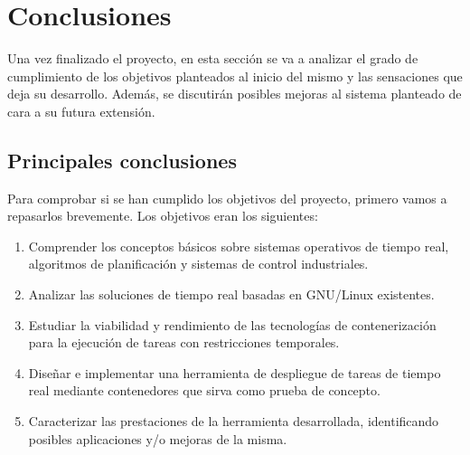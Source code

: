 \chapter{Conclusiones}
Una vez finalizado el proyecto, en esta sección se va a analizar el grado de
cumplimiento de los objetivos planteados al inicio del mismo y las sensaciones
que deja su desarrollo. Además, se discutirán posibles mejoras al sistema
planteado de cara a su futura extensión.

\section{Principales conclusiones}

Para comprobar si se han cumplido los objetivos del proyecto, primero vamos a
repasarlos brevemente. Los objetivos eran los siguientes:

\begin{enumerate}
    \item Comprender los conceptos básicos sobre sistemas operativos de tiempo
          real, algoritmos de planificación y sistemas de control industriales.
    \item Analizar las soluciones de tiempo real basadas en GNU/Linux existentes.
    \item Estudiar la viabilidad y rendimiento de las tecnologías de
          contenerización para la ejecución de tareas con restricciones temporales.
    \item Diseñar e implementar una herramienta de despliegue de tareas de
          tiempo real mediante contenedores que sirva como prueba de concepto.
    \item Caracterizar las prestaciones de la herramienta desarrollada,
          identificando posibles aplicaciones y/o mejoras de la misma.
\end{enumerate}


